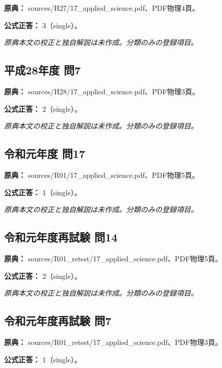 \noindent\textbf{原典：} sources/H27/17\_applied\_science.pdf、PDF物理4頁。

\textbf{公式正答：} 3（single）。

\par\textit{原典本文の校正と独自解説は未作成。分類のみの登録項目。}

\subsection{平成28年度 問7}
\label{q:h28-reg-applied-07}

\noindent\textbf{原典：} sources/H28/17\_applied\_science.pdf、PDF物理3頁。

\textbf{公式正答：} 2（single）。

\par\textit{原典本文の校正と独自解説は未作成。分類のみの登録項目。}

\subsection{令和元年度 問17}
\label{q:r01-reg-applied-17}

\noindent\textbf{原典：} sources/R01/17\_applied\_science.pdf、PDF物理5頁。

\textbf{公式正答：} 1（single）。

\par\textit{原典本文の校正と独自解説は未作成。分類のみの登録項目。}

\subsection{令和元年度再試験 問14}
\label{q:r01-ret-applied-14}

\noindent\textbf{原典：} sources/R01\_retest/17\_applied\_science.pdf、PDF物理5頁。

\textbf{公式正答：} 2（single）。

\par\textit{原典本文の校正と独自解説は未作成。分類のみの登録項目。}

\subsection{令和元年度再試験 問7}
\label{q:r01-ret-applied-07}

\noindent\textbf{原典：} sources/R01\_retest/17\_applied\_science.pdf、PDF物理3頁。

\textbf{公式正答：} 1（single）。

